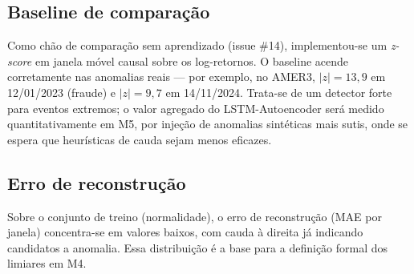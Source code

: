 \subsection{Baseline de comparação}
Como chão de comparação sem aprendizado (issue \#14), implementou-se um \emph{z-score} em
janela móvel causal sobre os log-retornos. O baseline acende corretamente nas anomalias
reais --- por exemplo, no AMER3, $|z|=13{,}9$ em 12/01/2023 (fraude) e $|z|=9{,}7$ em
14/11/2024. Trata-se de um detector forte para eventos extremos; o valor agregado do
LSTM-Autoencoder será medido quantitativamente em M5, por injeção de anomalias sintéticas
mais sutis, onde se espera que heurísticas de cauda sejam menos eficazes.

\subsection{Erro de reconstrução}
Sobre o conjunto de treino (normalidade), o erro de reconstrução (MAE por janela) concentra-se
em valores baixos, com cauda à direita já indicando candidatos a anomalia. Essa distribuição
é a base para a definição formal dos limiares em M4.
